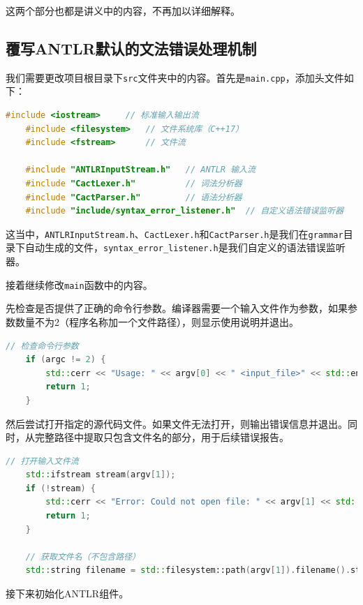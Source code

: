 \documentclass[UTF8]{report}
\begin{document}
这两个部分也都是讲义中的内容，不再加以详细解释。

\subsection{覆写ANTLR默认的文法错误处理机制}

我们需要更改项目根目录下\texttt{src}文件夹中的内容。首先是\texttt{main.cpp}，添加头文件如下：

\begin{lstlisting}[language=C++]
    #include <iostream>     // 标准输入输出流
    #include <filesystem>   // 文件系统库（C++17）
    #include <fstream>      // 文件流
    
    #include "ANTLRInputStream.h"   // ANTLR 输入流
    #include "CactLexer.h"          // 词法分析器
    #include "CactParser.h"         // 语法分析器
    #include "include/syntax_error_listener.h"  // 自定义语法错误监听器
\end{lstlisting}

这当中，\texttt{ANTLRInputStream.h}、\texttt{CactLexer.h}和\texttt{CactParser.h}是我们在\texttt{grammar}目录下自动生成的文件，\texttt{syntax\_error\_listener.h}是我们自定义的语法错误监听器。

接着继续修改\texttt{main}函数中的内容。

先检查是否提供了正确的命令行参数。编译器需要一个输入文件作为参数，如果参数数量不为2（程序名称加一个文件路径），则显示使用说明并退出。

\begin{lstlisting}[language=C++]
    // 检查命令行参数
    if (argc != 2) {
        std::cerr << "Usage: " << argv[0] << " <input_file>" << std::endl << std::endl;
        return 1;
    }
\end{lstlisting}

然后尝试打开指定的源代码文件。如果文件无法打开，则输出错误信息并退出。同时，从完整路径中提取只包含文件名的部分，用于后续错误报告。

\begin{lstlisting}[language=C++]
    // 打开输入文件流
    std::ifstream stream(argv[1]);
    if (!stream) {
        std::cerr << "Error: Could not open file: " << argv[1] << std::endl << std::endl;
        return 1;
    }
    
    // 获取文件名（不包含路径）
    std::string filename = std::filesystem::path(argv[1]).filename().string();
\end{lstlisting}

接下来初始化ANTLR组件。
\end{document}
